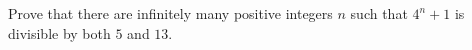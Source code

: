 Prove that there are infinitely many positive integers $n$ such that $4^n+1$ is divisible by both $5$ and $13$.
